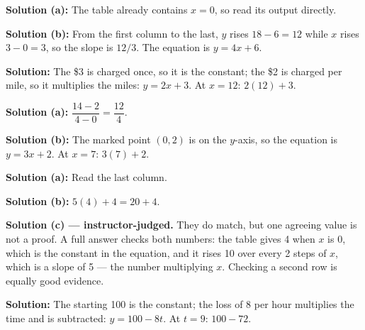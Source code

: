 \documentclass[12pt]{article}
\begin{document}




\textbf{Solution (a):} The table already contains $x = 0$, so read its output
directly. 

\textbf{Solution (b):} From the first column to the last, $y$ rises
$18 - 6 = 12$ while $x$ rises $3 - 0 = 3$, so the slope is $12/3$. The
equation is $y = 4x + 6$. 


\textbf{Solution:} The \$3 is charged once, so it is the constant; the \$2 is
charged per mile, so it multiplies the miles: $y = 2x + 3$. At $x = 12$:
$2(12) + 3$. 


\textbf{Solution (a):} $\dfrac{14 - 2}{4 - 0} = \dfrac{12}{4}$. 

\textbf{Solution (b):} The marked point $(0, 2)$ is on the $y$-axis, so the
equation is $y = 3x + 2$. At $x = 7$: $3(7) + 2$. 


\textbf{Solution (a):} Read the last column. 

\textbf{Solution (b):} $5(4) + 4 = 20 + 4$. 

\textbf{Solution (c) --- instructor-judged.} They do match, but one agreeing
value is not a proof. A full answer checks both numbers: the table gives 4 when
$x$ is 0, which is the constant in the equation, and it rises 10 over every 2
steps of $x$, which is a slope of 5 --- the number multiplying $x$. Checking a
second row is equally good evidence.


\textbf{Solution:} The starting 100 is the constant; the loss of 8 per hour
multiplies the time and is subtracted: $y = 100 - 8t$. At $t = 9$:
$100 - 72$. 

\end{document}
